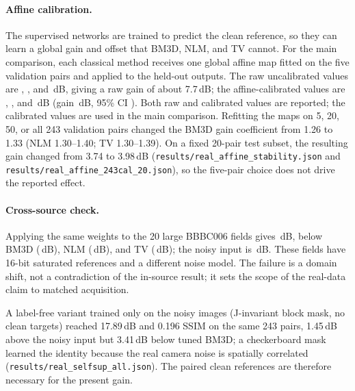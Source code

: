 \documentclass[11pt]{article}
\begin{document}
\paragraph{Affine calibration.}
The supervised networks are trained to predict the clean reference, so they can
learn a global gain and offset that BM3D, NLM, and TV cannot. For the main
comparison, each classical method receives one global affine map fitted on the
five validation pairs and applied to the held-out outputs. The raw uncalibrated
values are \RealBMThreeRawP, \RealNlmRawP, and \RealTvRawP\,dB, giving a raw
gain of about 7.7\,dB; the affine-calibrated values are \RealBMThreeP,
\RealNlmP, and \RealTvP\,dB (gain \RealGain\,dB, 95\% CI \RealCI). Both raw
and calibrated values are reported; the calibrated values are used in the main
comparison. Refitting the maps on 5, 20, 50, or all 243 validation pairs
changed the BM3D gain coefficient from 1.26 to 1.33 (NLM 1.30--1.40; TV
1.30--1.39). On a fixed 20-pair test subset, the resulting gain changed from
3.74 to 3.98\,dB (\texttt{results/real\_affine\_stability.json} and
\texttt{results/real\_affine\_243cal\_20.json}), so the five-pair choice does
not drive the reported effect.

\begin{table}[h]
\centering
\caption{Real noisy/clean pairs from the AI4Life-MDC25 Jacquemet source.
\RealN\ held-out $256\times256$ pairs; classical parameters tuned on
validation pairs. PSNR in dB.}
\label{tab:real}

\end{table}

\paragraph{Cross-source check.} Applying the same weights to the 20 large
BBBC006 fields gives \LargeRealUnetP\,dB, below BM3D (\LargeRealBMThreeP\,dB),
NLM (\LargeRealNlmP\,dB), and TV (\LargeRealTvP\,dB); the noisy input is
\LargeRealNoisyP\,dB. These fields have 16-bit saturated references and a
different noise model. The failure is a domain shift, not a contradiction of
the in-source result; it sets the scope of the real-data claim to matched
acquisition.

A label-free variant trained only on the noisy images (J-invariant block mask,
no clean targets) reached 17.89\,dB and 0.196 SSIM on the same 243 pairs,
1.45\,dB above the noisy input but 3.41\,dB below tuned BM3D; a checkerboard
mask learned the identity because the real camera noise is spatially correlated
(\texttt{results/real\_selfsup\_all.json}). The paired clean references are
therefore necessary for the present gain.
\end{document}
